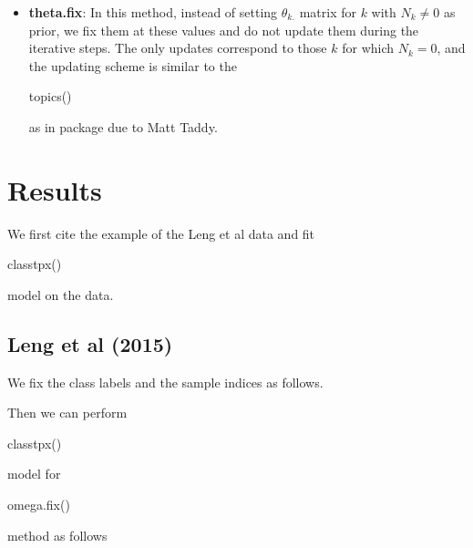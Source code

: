\documentclass[12pt]{article}
\begin{document}
\begin{itemize}
\item \textbf{theta.fix}: In this method, instead of setting $\theta_{k.}$ matrix for $k$ with $N_{k} \neq 0$ as prior, we fix them at these values and do not update them during the iterative steps. The only updates correspond to those $k$ for which $N_{k} = 0$, and the updating scheme is similar to the \begin{verb} topics() \end{verb} as in  package due to Matt Taddy.
\end{itemize}

\section{Results}

We first cite the example of the Leng et al data and fit \begin{verb} classtpx() \end{verb} model on the data. 

\subsection{Leng et al (2015)}

We fix the class labels and the sample indices as follows.

\begin{knitrout}
\color{fgcolor}\begin{kframe}
\begin{alltt}
 \hlkwb{<-} \hlopt{==}\hlstd{);}
 \hlkwb{<-} \hlopt{==}\hlstd{);}
 \hlkwb{<-} \hlopt{==}\hlstd{);}

 \hlkwb{<-} 
 \hlkwb{<-} \hlstd{(}\hlstd{(}\hlstd{,} 
                \hlstd{(}\hlstd{,} 
                \hlstd{(}\hlstd{,} 
\end{alltt}
\end{kframe}
\end{knitrout}

Then we can perform \begin{verb} classtpx() \end{verb} model for \begin{verb} omega.fix() \end{verb} method as follows 
\end{document}
